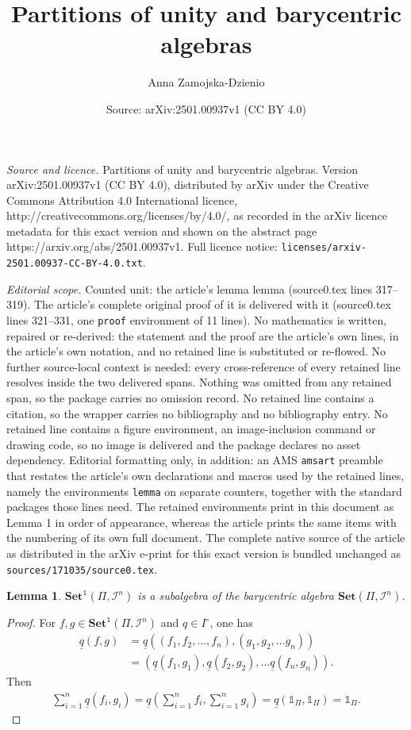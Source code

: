 \documentclass[10pt,a4paper]{amsart}
\title{Partitions of unity and barycentric algebras}
\author{Anna Zamojska-Dzienio}
\date{Source: arXiv:2501.00937v1 (CC BY 4.0)}
\newtheorem{lemma}{Lemma}
\begin{document}
\maketitle

\noindent\emph{Source and licence.} Partitions of unity and barycentric algebras. Version arXiv:2501.00937v1 (CC BY 4.0), distributed by arXiv under the Creative Commons Attribution 4.0 International licence, http://creativecommons.org/licenses/by/4.0/, as recorded in the arXiv licence metadata for this exact version and shown on the abstract page https://arxiv.org/abs/2501.00937v1. Full licence notice: \texttt{licenses/arxiv-2501.00937-CC-BY-4.0.txt}.\par\smallskip

\noindent\textit{Editorial scope.} Counted unit: the article's lemma lemma (source0.tex lines 317--319). The article's complete original proof of it is delivered with it (source0.tex lines 321--331, one \texttt{proof} environment of 11 lines). No mathematics is written, repaired or re-derived: the statement and the proof are the article's own lines, in the article's own notation, and no retained line is substituted or re-flowed.  No further source-local context is needed: every cross-reference of every retained line resolves inside the two delivered spans.  Nothing was omitted from any retained span, so the package carries no omission record.  No retained line contains a citation, so the wrapper carries no bibliography and no bibliography entry.  No retained line contains a figure environment, an image-inclusion command or drawing code, so no image is delivered and the package declares no asset dependency.  Editorial formatting only, in addition: an AMS \texttt{amsart} preamble that restates the article's own declarations and macros used by the retained lines, namely the environments \texttt{lemma} on separate counters, together with the standard packages those lines need.  The retained environments print in this document as Lemma 1 in order of appearance, whereas the article prints the same items with the numbering of its own full document.  The complete native source of the article as distributed in the arXiv e-print for this exact version is bundled unchanged as \texttt{sources/171035/source0.tex}.
\begin{lemma}
$\mathbf{Set}^{\mathds 1}(\Pi,\mathcal{I}^n)$ is a subalgebra of the barycentric algebra $\mathbf{Set}(\Pi,\mathcal{I}^n)$.
\end{lemma}

\begin{proof}
For $f,g\in\mathbf{Set}^{\mathds 1}(\Pi,\mathcal{I}^n)$ and $q\in I^\circ$, one has
\begin{align*}
\underline{q}(f,g)&=\underline{q}\left((f_1,f_2,\ldots ,f_n),(g_1,g_2,\ldots g_n)\right)\\
&=\left(\underline{q}(f_1,g_1),\underline{q}(f_2,g_2),\ldots \underline{q}(f_n,g_n)\right).
\end{align*}
Then
\begin{align*}
\sum_{i=1}^{n}\underline{q}(f_i,g_i)=\underline{q}\left(\sum_{i=1}^{n}f_i,\sum_{i=1}^{n}g_i\right)=\underline{q}(\mathds 1_\Pi,\mathds 1_\Pi)=\mathds 1_\Pi.
\end{align*}
\end{proof}
\end{document}
